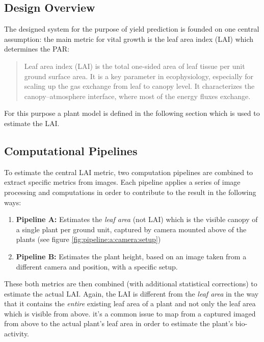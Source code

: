 \graphicspath{{members/ssr/figures/modelling}}

\subsection{Design Overview}\label{null:design-overview}


The designed system for the purpose of yield prediction is founded on one central assumption: 
the main metric for vital growth is the leaf area index (LAI) which determines the PAR:

\begin{quote}
    \centering
    Leaf area index (LAI) is the total one‐sided area of leaf tissue per unit ground surface area.
    It is a key parameter in ecophysiology, especially for scaling up the gas exchange from leaf
    to canopy level.
    It characterizes the canopy–atmosphere interface, where most of the energy fluxes exchange. \cite{beda:nathalie}
\end{quote}

For this purpose a plant model is defined in the following section which is used to estimate
the LAI.



\subsection{Computational Pipelines}\label{subsec:computational-pipelines}


To estimate the central LAI metric, two computation pipelines are combined to extract specific metrics from images.
Each pipeline applies a series of image processing and computations in order to contribute to the result
in the following ways:

\begin{enumerate}
    \item \textbf{Pipeline A:} Estimates the \textit{leaf area} (not LAI) which is the visible canopy
    of a single plant per ground unit, captured by camera mounted above of the plants (see figure \ref{fig:pipeline:a:camera:setup})
    \item \textbf{Pipeline B:} Estimates the plant height, based on an image taken from a different camera and position,
    with a specific setup.
\end{enumerate}

These both metrics are then combined (with additional statistical corrections) to estimate the actual LAI.
Again, the LAI is different from the \textit{leaf area} in the way that it contains
the \textit{entire} existing leaf area of a plant and not only the leaf area which is visible from above.
it's a common issue to map from a captured imaged from above to the actual plant's leaf area in order
to estimate the plant's bio-activity.

